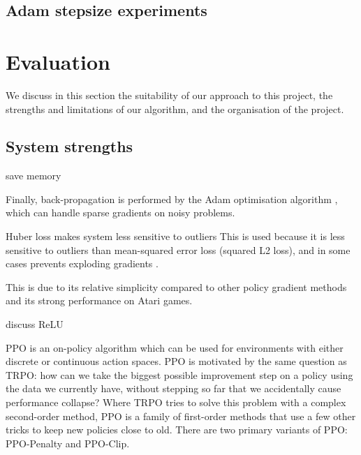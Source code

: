 \documentclass[12pt,a4paper]{article}
\begin{document}
\subsection{Adam stepsize experiments}

\newpage
\section{Evaluation}
We discuss in this section the suitability of our approach to this project, the strengths and limitations of our algorithm, and the organisation of the project.

\subsection{System strengths} 
save memory

Finally, back-propagation is performed by the Adam optimisation algorithm \cite{kingma2017adam}, which can handle sparse gradients on noisy problems.

Huber loss makes system less sensitive to outliers
This is used because it is less sensitive to outliers than mean-squared error loss (squared L2 loss), and in some cases prevents exploding gradients \cite{girshick2015fast}.

This is due to its relative simplicity compared to other policy gradient methods and its strong performance on Atari games.

discuss ReLU



PPO is an on-policy algorithm which can be used for environments with either discrete or continuous action spaces. PPO is motivated by the same question as TRPO: how can we take the biggest possible improvement step on a policy using the data we currently have, without stepping so far that we accidentally cause performance collapse? Where TRPO tries to solve this problem with a complex second-order method, PPO is a family of first-order methods that use a few other tricks to keep new policies close to old. There are two primary variants of PPO: PPO-Penalty and PPO-Clip.
\end{document}
